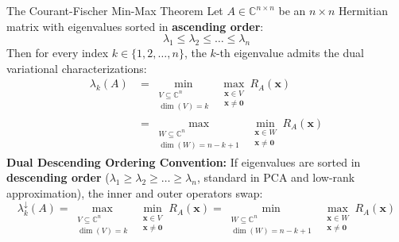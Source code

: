 \begin{theorembox}{The Courant-Fischer Min-Max Theorem}
\label{thm:courant_fischer}
Let $A \in \mathbb{C}^{n \times n}$ be an $n \times n$ Hermitian matrix with eigenvalues sorted in \textbf{ascending order}:
\begin{equation*}
\lambda_1 \le \lambda_2 \le \dots \le \lambda_n
\end{equation*}
Then for every index $k \in \{1, 2, \dots, n\}$, the $k$-th eigenvalue admits the dual variational characterizations:
\begin{align}
\lambda_k(A) &= \min_{\substack{V \subseteq \mathbb{C}^n \\ \dim(V) = k}} \; \max_{\substack{\mathbf{x} \in V \\ \mathbf{x} \ne \mathbf{0}}} R_A(\mathbf{x}) \label{eq:courant_fischer_minmax} \\[4pt]
&= \max_{\substack{W \subseteq \mathbb{C}^n \\ \dim(W) = n - k + 1}} \; \min_{\substack{\mathbf{x} \in W \\ \mathbf{x} \ne \mathbf{0}}} R_A(\mathbf{x}) \label{eq:courant_fischer_maxmin}
\end{align}
\textbf{Dual Descending Ordering Convention:}
If eigenvalues are sorted in \textbf{descending order} ($\lambda_1 \ge \lambda_2 \ge \dots \ge \lambda_n$, standard in PCA and low-rank approximation), the inner and outer operators swap:
\begin{equation}
\lambda_k^{\downarrow}(A) = \max_{\substack{V \subseteq \mathbb{C}^n \\ \dim(V) = k}} \; \min_{\substack{\mathbf{x} \in V \\ \mathbf{x} \ne \mathbf{0}}} R_A(\mathbf{x}) = \min_{\substack{W \subseteq \mathbb{C}^n \\ \dim(W) = n - k + 1}} \; \max_{\substack{\mathbf{x} \in W \\ \mathbf{x} \ne \mathbf{0}}} R_A(\mathbf{x})
\label{eq:courant_fischer_descending}
\end{equation}
\end{theorembox}

